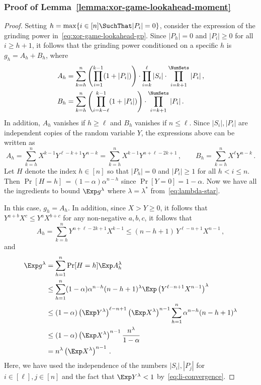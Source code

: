 \subsubsection*{Proof of Lemma~\ref{lemma:xor-game-lookahead-moment}}
\begin{proof}
Setting $h = \max\{i \in [n] \SuchThat |P_i| = 0\}$, 
consider the expression of the grinding power in~\ref{eq:xor-game-lookahead-gp}. 
Since $|P_h| = 0$ and $|P_i| \geq 0$ for all $i \geq h+1$, it follows that 
the grinding power conditioned on a specific $h$ is
$g_h = A_h + B_h$, where
\begin{align*}
    A_h &= \sum_{k=h}^n 
        \left(\prod_{i=1}^{k-1}(1 + |P_i|)\right) \cdot  
        \prod_{i=k}^\ell |S_i| \cdot 
        \prod_{i=k+1}^\NumSets |P_i| \,,
         \nonumber \\
    B_h &= \sum_{k=h}^n 
        \left(\prod_{i=k - \ell}^{k-1}(1 + |P_i|)\right) \cdot
        \prod_{i=k+1}^\NumSets |P_i|
    \,.
\end{align*}
In addition, $A_h$ vanishes if $h \geq \ell$ and $B_h$ vanishes if $n \leq \ell$. 
Since $|S_i|, |P_i|$ are independent copies of the random variable $Y$, the expressions above can be written as
\[
    A_h = \sum_{k=h}^n 
        X^{k-1} Y^{\ell - k + 1} Y^{n - k} 
        = \sum_{k=h}^n X^{k-1} Y^{n + \ell - 2k + 1}
        \,,\qquad
    B_h = \sum_{k=h}^n 
        X^\ell Y^{n - k}
    \,.
\]
Let $H$ denote the index $h \in [n]$ so that $|P_h| = 0$ and $|P_i| \geq 1$ for all $h < i \leq n$. 
Then $\Pr[H = h]\, = (1-\alpha) \alpha^{n-h}$ since $\Pr[Y = 0] = 1 - \alpha$. 
Now we have all the ingredients to bound $\Exp g^\lambda$ where $\lambda = \lambda^*$ from~\eqref{eq:lambda-star}. 

In this case, $g_h = A_h$. 
In addition, since $X > Y \geq 0$, it follows that $Y^{a+b} X^c \leq Y^a X^{b+c}$ 
for any non-negative $a,b,c$, it follows that
\[
    A_h = \sum_{k=h}^n Y^{n+\ell-2k+1} X^{k-1} \leq (n - h + 1)\, Y^{\ell - n + 1} X^{n-1}\,,
\]
and
\begin{align*}
    \Exp g^\lambda 
        &= \sum_{h=1}^n \Pr[H = h] \Exp A_h^\lambda \\
        &\leq \sum_{h=1}^n (1-\alpha) \alpha^{n-h} (n - h + 1)^\lambda \Exp \left(Y^{\ell - n + 1} X^{n-1}\right)^\lambda \\
        &\leq  (1-\alpha)  \left(\Exp Y^\lambda\right)^{\ell - n + 1} \left(\Exp X^\lambda \right)^{n-1} 
            \sum_{h=1}^n \alpha^{n-h} (n - h + 1)^\lambda \\
        &\leq  (1-\alpha)  \left(\Exp X^\lambda \right)^{n-1} 
            \frac{n^\lambda}{1-\alpha} \\
        &= n^\lambda \left(\Exp X^\lambda \right)^{n-1} \,.
\end{align*}
Here, we have used the independence of the numbers $|S_i|, |P_j|$ for $i \in [\ell], j \in [n]$ 
and the fact that $\Exp Y^\lambda < 1$ by~\eqref{eq:li-convergence}.


\end{proof}
